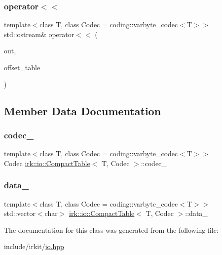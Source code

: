 \subsubsection{\texorpdfstring{operator$<$$<$}{operator<<}}
{\footnotesize\ttfamily template$<$class T, class Codec = coding\+::varbyte\+\_\+codec$<$\+T$>$$>$ \\
std\+::ostream\& operator$<$$<$ (\begin{DoxyParamCaption}\item[{std\+::ostream \&}]{out,  }\item[{const \mbox{\hyperlink{classirk_1_1io_1_1CompactTable}{Compact\+Table}}$<$ T, Codec $>$ \&}]{offset\+\_\+table }\end{DoxyParamCaption})\hspace{0.3cm}{\ttfamily [friend]}}



\subsection{Member Data Documentation}
\mbox{\label{classirk_1_1io_1_1CompactTable_a8698a3887b96c02a3b5f134bc3d1fdde}} 
\subsubsection{\texorpdfstring{codec\+\_\+}{codec\_}}
{\footnotesize\ttfamily template$<$class T, class Codec = coding\+::varbyte\+\_\+codec$<$\+T$>$$>$ \\
Codec \mbox{\hyperlink{classirk_1_1io_1_1CompactTable}{irk\+::io\+::\+Compact\+Table}}$<$ T, Codec $>$\+::codec\+\_\+\hspace{0.3cm}{\ttfamily [protected]}}

\mbox{\label{classirk_1_1io_1_1CompactTable_aa55d106e2d93e23efe731078be71eae9}} 
\subsubsection{\texorpdfstring{data\+\_\+}{data\_}}
{\footnotesize\ttfamily template$<$class T, class Codec = coding\+::varbyte\+\_\+codec$<$\+T$>$$>$ \\
std\+::vector$<$char$>$ \mbox{\hyperlink{classirk_1_1io_1_1CompactTable}{irk\+::io\+::\+Compact\+Table}}$<$ T, Codec $>$\+::data\+\_\+\hspace{0.3cm}{\ttfamily [protected]}}



The documentation for this class was generated from the following file\+:\begin{DoxyCompactItemize}
\item 
include/irkit/\mbox{\hyperlink{io_8hpp}{io.\+hpp}}\end{DoxyCompactItemize}
